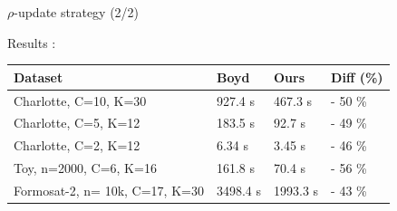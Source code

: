 \documentclass[aspectratio=1610,usenames,dvipsnames]{beamer}
\begin{document}
\begin{frame}{$\rho$-update strategy (2/2)}

Results :

\begin{center}
\begin{tabular}{llll}
Dataset & Boyd & Ours & Diff (\%)\\
\hline
Charlotte, C=10, K=30 & 927.4 s & 467.3 s & - 50 \%\\
Charlotte, C=5, K=12 & 183.5 s & 92.7 s & - 49 \%\\
Charlotte, C=2, K=12 & 6.34 s & 3.45 s & - 46 \%\\
Toy, n=2000, C=6, K=16 & 161.8 s & 70.4 s & - 56 \%\\
Formosat-2, n= 10k, C=17, K=30 & 3498.4 s & 1993.3 s & - 43 \%\\
\end{tabular}
\end{center}

\end{frame}
\end{document}
